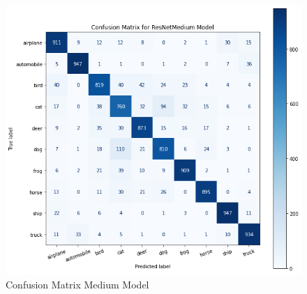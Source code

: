 \documentclass[letterpaper]{article} %
\begin{document}
\begin{figure}[htbp]
\captionsetup[subfigure]{justification=centering}
  \centering
  \includegraphics[scale = 0.4]{image/con_medi.png}
  \caption{Confusion Matrix Medium Model}
\end{figure}
\end{document}
